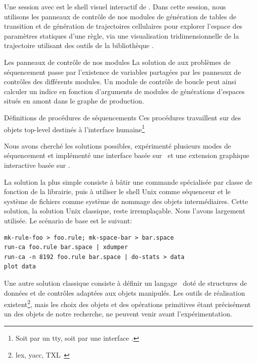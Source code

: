 %
{}%
{Une session avec }%
{ est le shell visuel interactif de . %
  Dans cette session, nous utilisons les panneaux de contrôle de nos
  modules de génération de tables de transition et de génération de
  trajectoires cellulaires pour explorer l'espace des paramètres
  statiques d'une règle, via une visualisation tridimensionnelle de
  la trajectoire utilisant des outils de la bibliothèque
  .}

%
{}%
{Les panneaux de contrôle de nos modules }%
{La solution de  aux problèmes de séquencement passe
  par l'existence de variables partagées par les panneaux de contrôles
  des différents modules. %
  Un module de contrôle de boucle peut ainsi calculer un indice en
  fonction d'arguments de modules de générations d'espaces situés en
  amont dans le graphe de production.}

%
{}%
{Définitions de procédures de séquencements}%
{Ces procédures travaillent sur des objets top-level destinés à
  l'interface humaine\footnote{%
    Soit par un tty, soit par une interface . %
    }}

Nous avons cherché les solutions possibles, expérimenté plusieurs modes
de séquencement et implémenté une interface  basée
sur~ et une extension graphique interactive basée sur
. %

La solution la plus simple consiste à bâtir une commande spécialisée
par classe de fonction de la librairie, puis à utiliser le shell Unix
comme séquenceur et le système de fichiers comme système de nommage des
objets intermédiaires. %
Cette solution, la solution Unix classique, reste irremplaçable. %
Nous l'avons largement utilisée. %
Le scénario de base est le suivant:
\begin{verbatim}
mk-rule-foo > foo.rule; mk-space-bar > bar.space
run-ca foo.rule bar.space | xdumper
run-ca -n 8192 foo.rule bar.space | do-stats > data
plot data
\end{verbatim}

Une autre solution classique consiste à définir un
langage~\cite[]{Almasi87,Eckart92b} doté de structures de données et de
contrôles adaptées aux objets manipulés. %
Les outils de réalisation existent\footnote{%
  lex, yacc, TXL~\cite[]{Cordy91}}, %
mais les choix des objets et des opérations primitives étant
précisément un des objets de notre recherche, ne peuvent venir avant
l'expérimentation.

